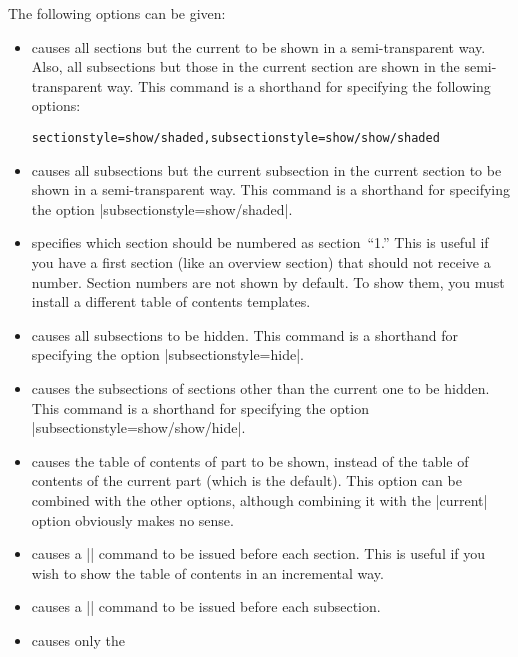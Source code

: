 \begin{command}{\tableofcontents{}}
  The following options can be given:
  \begin{itemize}
  \item
     causes all sections but the current to
    be shown in a semi-transparent way. Also, all subsections but
    those in the current section are shown in the semi-transparent
    way. This command is a shorthand for specifying the following
    options:
\begin{verbatim}
sectionstyle=show/shaded,subsectionstyle=show/show/shaded
\end{verbatim}
  \item
     causes all subsections but the
    current subsection in the current section to be shown in a
    semi-transparent way. This command is a shorthand for specifying
    the option |subsectionstyle=show/shaded|.
  \item
     specifies which
    section should be numbered as section~``1.''  This is useful if
    you have a first section (like an overview section) that should
    not receive a number. Section numbers are not shown by default. To
    show them, you must install a different table of contents
    templates.
  \item
     causes all subsections to be
    hidden. This command is a shorthand for specifying
    the option |subsectionstyle=hide|.
  \item
     causes the subsections of
    sections other than the current one to be hidden. This command is
    a shorthand for specifying the option |subsectionstyle=show/show/hide|.
  \item
     causes the table of contents
    of part  to be shown, instead of the table of
    contents of the current part (which is the default). This option
    can be combined with the other options, although combining it with
    the |current| option obviously makes no sense.
  \item
     causes a |\pause| command to
    be issued before each section. This is useful if you wish to show
    the table of contents in an incremental way.
  \item
     causes a |\pause| command to
    be issued before each subsection.
  \item
     causes only the

\end{itemize}
\end{command}
